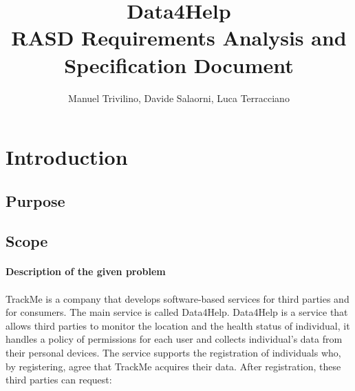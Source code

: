 \documentclass[a4paper]{article}
\begin{document}
\author{Manuel Trivilino, Davide Salaorni, Luca Terracciano}

\title{\Large Data4Help\\
\Large RASD Requirements Analysis and Specification Document
}

\maketitle
\newpage

\tableofcontents
\newpage

\section{Introduction}

\subsection{Purpose}

\subsection{Scope}

\paragraph{Description of the given problem}

\paragraph{}
TrackMe is a company that develops software-based services for third parties and for consumers. The main service is called Data4Help.
 Data4Help is a service that allows third parties to monitor the location and the health status of individual, it handles a policy of permissions for each user and collects individual’s data from their personal devices.
The service supports the registration of individuals who, by registering, agree that TrackMe acquires their data. After registration, these third parties can request:
\end{document}
